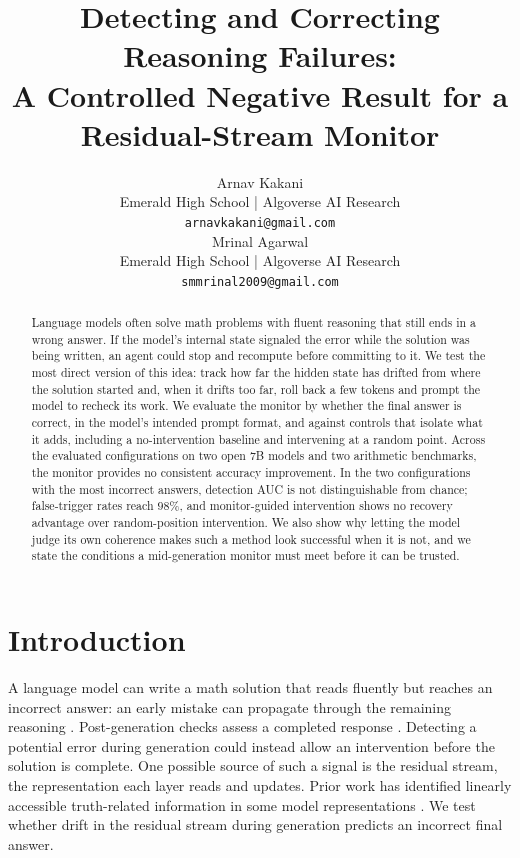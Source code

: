 \documentclass{article}
\title{Detecting and Correcting Reasoning Failures:\\
A Controlled Negative Result for a Residual-Stream Monitor}
\author{%
  Arnav Kakani \\
  Emerald High School | Algoverse AI Research\\
  \texttt{arnavkakani@gmail.com} \\
  \And
  Mrinal Agarwal \\
  Emerald High School | Algoverse AI Research\\
  \texttt{smmrinal2009@gmail.com}
}
\begin{document}
\maketitle

\begin{abstract}
Language models often solve math problems with fluent reasoning that still ends in a wrong answer. If the model's internal state signaled the error while the solution was being written, an agent could stop and recompute before committing to it. We test the most direct version of this idea: track how far the hidden state has drifted from where the solution started and, when it drifts too far, roll back a few tokens and prompt the model to recheck its work. We evaluate the monitor by whether the final answer is correct, in the model's intended prompt format, and against controls that isolate what it adds, including a no-intervention baseline and intervening at a random point. Across the evaluated configurations on two open 7B models and two arithmetic benchmarks, the monitor provides no consistent accuracy improvement. In the two configurations with the most incorrect answers, detection AUC is not distinguishable from chance; false-trigger rates reach $98\%$, and monitor-guided intervention shows no recovery advantage over random-position intervention. We also show why letting the model judge its own coherence makes such a method look successful when it is not, and we state the conditions a mid-generation monitor must meet before it can be trusted. \end{abstract}

\section{Introduction}
\label{sec:intro}

A language model can write a math solution that reads fluently but reaches an incorrect answer: an early mistake can propagate through the remaining reasoning \citep{cobbe2021gsm8k, lightman2023verify}. Post-generation checks assess a completed response \citep{kuhn2023semantic, azaria2023internal}. Detecting a potential error during generation could instead allow an intervention before the solution is complete. One possible source of such a signal is the residual stream, the representation each layer reads and updates. Prior work has identified linearly accessible truth-related information in some model representations \citep{marks2023geometry, azaria2023internal}. We test whether drift in the residual stream during generation predicts an incorrect final answer.
\end{document}
